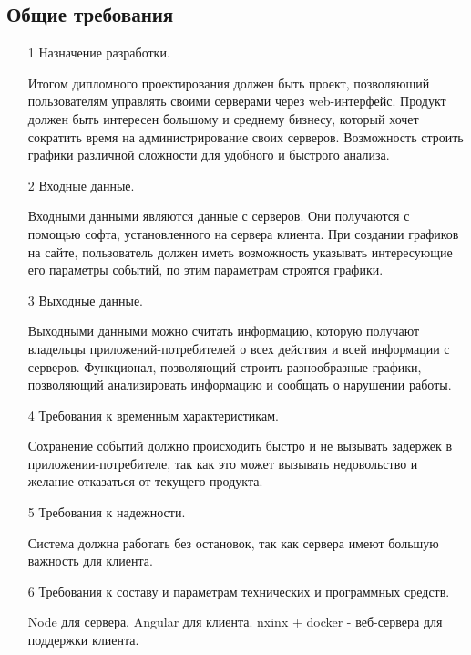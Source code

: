 \subsection{Общие требования}


\begin{itemize}
  \item[1] Назначение разработки.

\hspace*{2.5em}Итогом дипломного проектирования должен быть проект, позволяющий пользователям управлять своими серверами через web-интерфейс. 
Продукт должен быть интересен большому и среднему бизнесу, который хочет сократить время на администрирование своих серверов.
Возможность строить графики различной сложности для удобного и быстрого анализа.

  \item[2] Входные данные.

\hspace*{2.5em}Входными данными являются данные с серверов. Они получаются с помощью софта, установленного на сервера клиента.
При создании графиков на сайте, пользователь должен иметь возможность указывать интересующие его параметры событий, по этим параметрам строятся графики.

  \item[3] Выходные данные.

\hspace*{2.5em}Выходными данными можно считать информацию, которую получают владельцы приложений-потребителей о всех действия и всей информации с серверов. Функционал, позволяющий строить разнообразные графики, позволяющий анализировать информацию и сообщать о нарушении работы. 
 
  \item[4] Требования к временным характеристикам.

\hspace*{2.5em}Сохранение событий должно происходить быстро и не вызывать задержек в приложении-потребителе, так как это может вызывать недовольство и желание отказаться от текущего продукта. 

  \item[5] Требования к надежности.

\hspace*{2.5em}Система должна работать без остановок, так как сервера имеют большую важность для клиента.

  \item[6] Требования к составу и параметрам технических и программных средств.

\hspace*{2.5em}Node для сервера.
Angular для клиента.
nxinx + docker - веб-сервера для поддержки клиента.

\end{itemize}
 